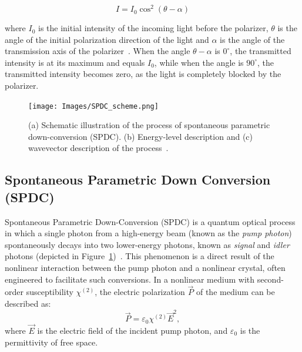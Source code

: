 \documentclass[prl,twocolumn]{revtex4-1}
\begin{document}
\begin{equation}
    I = I_0 \cos^2(\theta - \alpha)
    \label{eq:malus_law}
\end{equation}

where $I_0$ is the initial intensity of the incoming light before the polarizer, $\theta$ is the angle of the initial polarization direction of the light and $\alpha$ is the angle of the transmission axis of the polarizer~\cite{pap2}. When the angle $\theta - \alpha$ is $0^\circ$, the transmitted intensity is at its maximum and equals $I_0$, while when the angle is $90^\circ$, the transmitted intensity becomes zero, as the light is completely blocked by the polarizer.

\begin{figure}[!t]
    \centering
    \texttt{[image: Images/SPDC\_scheme.png]}
    \caption{(a) Schematic illustration of the process of spontaneous parametric down-conversion (SPDC). (b) Energy-level description and (c) wavevector description of the process~\cite{pap3}.}
    \label{fig:SPDC_scheme}
\end{figure}

\subsection{Spontaneous Parametric Down Conversion (SPDC)}
\label{sec:SPDC}

Spontaneous Parametric Down-Conversion (SPDC) is a quantum optical process in which a single photon from a high-energy beam (known as the \textit{pump photon}) spontaneously decays into two lower-energy photons, known as \textit{signal} and \textit{idler} photons (depicted in Figure~\ref{fig:SPDC_scheme})~\cite{pap3}. This phenomenon is a direct result of the nonlinear interaction between the pump photon and a nonlinear crystal, often engineered to facilitate such conversions. 
In a nonlinear medium with second-order susceptibility $\chi^{(2)}$, the electric polarization $\vec{P}$ of the medium can be described as:
%
\begin{equation}
\vec{P} = \varepsilon_0 \chi^{(2)} \vec{E}^2,
\end{equation}
%
where $\vec{E}$ is the electric field of the incident pump photon, and $\varepsilon_0$ is the permittivity of free space.
\end{document}
